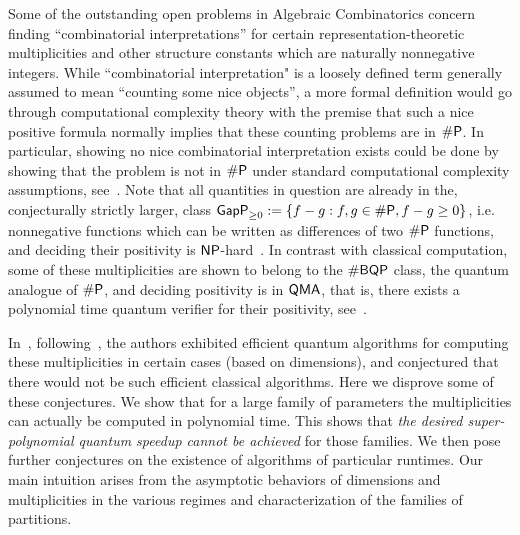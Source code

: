 \documentclass[11pt]{amsart}
\theoremstyle{plain}
\theoremstyle{definition}
\numberwithin{equation}{section}
\def\SP{{{\rm{\textsf{\#P}}}}}
\def\GapP{{{\rm{\textsf{GapP}} }}}
\def\NP{{{\rm{\textsf{NP}} }}}
\def\SBQP{{\rm{\textsf{\#BQP}}}}
\def\QMA{{\rm{\textsf{QMA}}}}
\begin{document}
Some of the outstanding open problems in Algebraic Combinatorics concern finding ``combinatorial interpretations'' for certain representation-theoretic multiplicities and other structure constants which are naturally nonnegative integers. While ``combinatorial interpretation" is a loosely defined term generally assumed to mean ``counting some nice objects'', a more formal definition would go through computational complexity theory with the premise that such a nice positive formula normally implies that these counting problems are in $\SP$. In particular, showing no nice combinatorial interpretation exists could be done by showing that the problem is not in $\SP$ under standard computational complexity assumptions, see~\cite{Pak22,panova2023computational}. Note that all quantities in question are already  in the, conjecturally strictly larger, class $\GapP_{\geq 0}:=\{ f -g: f,g \in \SP, f-g \geq 0\}$, i.e. nonnegative functions which can be written as differences of two $\SP$ functions, and deciding their positivity is $\NP$-hard~\cite{FI20,IMW17}. In contrast with classical computation, some of these multiplicities are shown to belong to the $\SBQP$ class, the quantum analogue of $\SP$, and deciding positivity is in $\QMA$, that is, there exists a polynomial time quantum verifier for their positivity, see~\cite{bravyi2024quantum,CHW,ikenmeyer2023remark}. 

In~\cite{LH24}, following~\cite{bravyi2024quantum}, the authors exhibited efficient quantum algorithms for computing these multiplicities in certain cases (based on dimensions), and conjectured that there would not be such efficient classical algorithms. Here we disprove some of these conjectures. We show that for a large family of parameters the multiplicities can actually be computed in polynomial time. This shows that \emph{the desired super-polynomial quantum speedup cannot be achieved} for those families. We then pose further conjectures on the existence of algorithms of particular runtimes. Our main intuition arises from the asymptotic behaviors of dimensions and multiplicities in the various regimes and characterization of the families of partitions.
\end{document}
